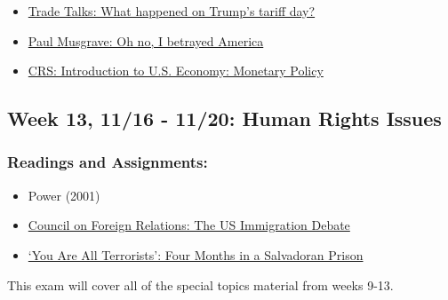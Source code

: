 \documentclass[
  letterpaper,
  DIV=11,
  numbers=noendperiod]{scrartcl}
\providecommand{\tightlist}{%
  \setlength{\itemsep}{0pt}\setlength{\parskip}{0pt}}
\begin{document}
\begin{tcolorbox}[enhanced jigsaw, arc=.35mm, bottomrule=.15mm, bottomtitle=1mm, breakable, colback=white, colbacktitle=quarto-callout-important-color!10!white, colframe=quarto-callout-important-color-frame, coltitle=black, left=2mm, leftrule=.75mm, opacityback=0, opacitybacktitle=0.6, rightrule=.15mm, title=\textcolor{quarto-callout-important-color}{\faExclamation}\hspace{0.5em}{Friday 11/13: Discussion Day}, titlerule=0mm, toprule=.15mm, toptitle=1mm]

\begin{itemize}
\tightlist
\item
  \href{https://tradetalkspodcast.com/podcast/207-what-happened-on-trumps-tariff-day/}{Trade
  Talks: What happened on Trump's tariff day?}
\item
  \href{https://musgrave.substack.com/p/oh-no-i-betrayed-america}{Paul
  Musgrave: Oh no, I betrayed America}
\item
  \href{https://www.congress.gov/crs_external_products/IF/PDF/IF11751/IF11751.12.pdf}{CRS:
  Introduction to U.S. Economy: Monetary Policy}
\end{itemize}

\end{tcolorbox}

\subsection{Week 13, 11/16 - 11/20: Human Rights
Issues}\label{week-13-1116---1120-human-rights-issues}

\subsubsection{Readings and
Assignments:}\label{readings-and-assignments-12}

\begin{itemize}
\tightlist
\item
  Power (2001)
\item
  \href{https://www.cfr.org/backgrounder/us-immigration-debate-0}{Council
  on Foreign Relations: The US Immigration Debate}
\item
  \href{https://www.nytimes.com/2025/11/08/world/americas/el-salvador-prison-migrants.html}{`You
  Are All Terrorists': Four Months in a Salvadoran Prison}
\end{itemize}

\begin{tcolorbox}[enhanced jigsaw, arc=.35mm, bottomrule=.15mm, bottomtitle=1mm, breakable, colback=white, colbacktitle=quarto-callout-important-color!10!white, colframe=quarto-callout-important-color-frame, coltitle=black, left=2mm, leftrule=.75mm, opacityback=0, opacitybacktitle=0.6, rightrule=.15mm, title=\textcolor{quarto-callout-important-color}{\faExclamation}\hspace{0.5em}{Friday 11/20: Exam 3: Selected Topics}, titlerule=0mm, toprule=.15mm, toptitle=1mm]

This exam will cover all of the special topics material from weeks 9-13.

\end{tcolorbox}
\end{document}
